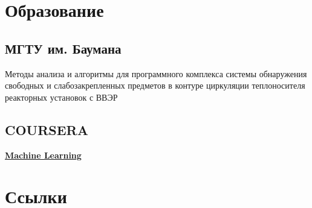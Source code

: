 \documentclass[a4paper]{resume}
\begin{document}
\begin{minipage}[t]{0.33\textwidth} %


\section{Образование} 

\subsection{МГТУ им. Баумана}


\sectionspace %

Методы анализа и алгоритмы для программного комплекса системы обнаружения свободных и слабозакрепленных предметов в контуре циркуляции теплоносителя реакторных установок с ВВЭР

\sectionspace
\subsection{COURSERA}
\vspace{\topsep}
\begin{tightitemize}
	\item \href{https://www.coursera.org/maestro/api/certificate/get_certificate?course_id=972304}{\bf Machine Learning}
\end{tightitemize}



\sectionspace %



\section{Ссылки} 


\end{minipage}
\end{document}
